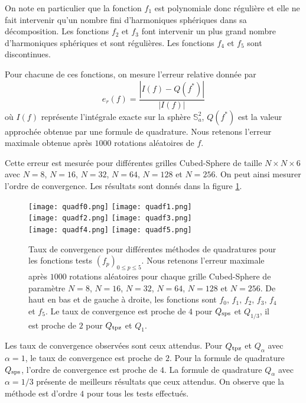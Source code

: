 On note en particulier que la fonction $f_1$ est polynomiale donc régulière et elle ne fait intervenir qu'un nombre fini d'harmoniques sphériques dans sa décomposition. Les fonctions $f_2$ et $f_3$ font intervenir un plus grand nombre d'harmoniques sphériques et sont régulières.
Les fonctions $f_4$ et $f_5$ sont discontinues. 

Pour chacune de ces fonctions, on mesure l'erreur relative donnée par
\begin{equation}
e_r(f) = \dfrac{|I(f) - Q(f^*)|}{|I(f)|}
\end{equation}
où $I(f)$ représente l'intégrale exacte sur la sphère $\mathbb{S}_a^2$, $Q(f^*)$ est la valeur approchée obtenue par une formule de quadrature.
Nous retenons l'erreur maximale obtenue après $1000$ rotations aléatoires de $f$.

Cette erreur est mesurée pour différentes grilles Cubed-Sphere de taille $N \times N \times 6$ avec $N=8$, $N=16$, $N=32$, $N=64$, $N=128$ et $N=256$. On peut ainsi mesurer l'ordre de convergence. Les résultats sont donnés dans la figure \ref{fig:rate_quad}.


\begin{figure}[htbp]
\begin{center}
\texttt{[image: quadf0.png]}
\texttt{[image: quadf1.png]}\\
\texttt{[image: quadf2.png]}
\texttt{[image: quadf3.png]}\\
\texttt{[image: quadf4.png]}
\texttt{[image: quadf5.png]}\\
\end{center}
\caption{Taux de convergence pour différentes méthodes de quadratures pour les fonctions tests $(f_p)_{0 \leq p \leq 5}$. Nous retenons l'erreur maximale après $1000$ rotations aléatoires pour chaque grille Cubed-Sphere de paramètre $N=8$, $N=16$, $N=32$, $N=64$, $N=128$ et $N=256$. De haut en bas et de gauche à droite, les fonctions sont $f_0$, $f_1$, $f_2$, $f_3$, $f_4$ et $f_5$. Le taux de convergence est proche de $4$ pour $Q_{\text{sps}}$ et $Q_{1/3}$, il est proche de $2$ pour $Q_{\text{tpz}}$ et $Q_1$.}
\label{fig:rate_quad}
\end{figure}

Les taux de convergence observées sont ceux attendus. Pour $Q_{\text{tpz}}$ et $Q_{\alpha}$ avec $\alpha=1$, le taux de convergence est proche de $2$. Pour la formule de quadrature $Q_{\text{sps}}$, l'ordre de convergence est proche de $4$. La formule de quadrature $Q_{\alpha}$ avec $\alpha = 1/3$ présente de meilleurs résultats que ceux attendus. On observe que la méthode est d'ordre $4$ pour tous les tests effectués.

